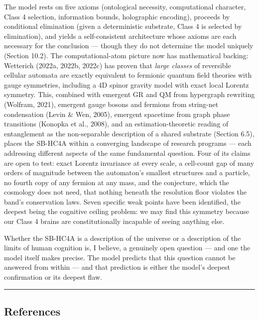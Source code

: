 \documentclass[
]{article}
\begin{document}
The model rests on five axioms (ontological necessity, computational
character, Class 4 selection, information bounds, holographic encoding),
proceeds by conditional elimination (given a deterministic substrate,
Class 4 is selected by elimination), and yields a self-consistent
architecture whose axioms are each necessary for the conclusion ---
though they do not determine the model uniquely (Section 10.2). The
computational-atom picture now has mathematical backing: Wetterich
(2022a, 2022b, 2022c) has proven that \emph{large classes} of reversible
cellular automata are exactly equivalent to fermionic quantum field
theories with gauge symmetries, including a 4D spinor gravity model with
exact local Lorentz symmetry. This, combined with emergent GR and QM
from hypergraph rewriting (Wolfram, 2021), emergent gauge bosons and
fermions from string-net condensation (Levin \& Wen, 2005), emergent
spacetime from graph phase transitions (Konopka et al., 2008), and an
estimation-theoretic reading of entanglement as the non-separable
description of a shared substrate (Section 6.5), places the SB-HC4A
within a converging landscape of research programs --- each addressing
different aspects of the same fundamental question. Four of its claims
are open to test: exact Lorentz invariance at every scale, a cell-count
gap of many orders of magnitude between the automaton's smallest
structures and a particle, no fourth copy of any fermion at any mass,
and the conjecture, which the cosmology does not need, that nothing
beneath the resolution floor violates the band's conservation laws.
Seven specific weak points have been identified, the deepest being the
cognitive ceiling problem: we may find this symmetry because our Class 4
brains are constitutionally incapable of seeing anything else.

Whether the SB-HC4A is a description of the universe or a description of
the limits of human cognition is, I believe, a genuinely open question
--- and one the model itself makes precise. The model predicts that this
question cannot be answered from within --- and that prediction is
either the model's deepest confirmation or its deepest flaw.

\begin{center}\rule{0.5\linewidth}{0.5pt}\end{center}

\hypertarget{references}{%
\subsection{References}\label{references}}
\end{document}
